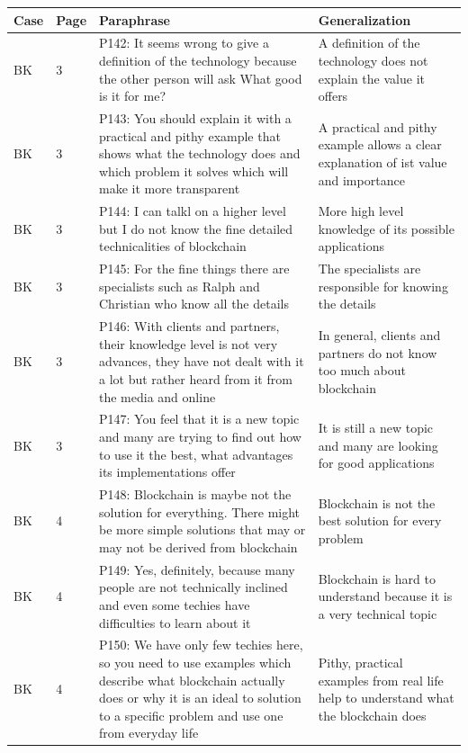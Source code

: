 \begin{table}[H]
    \centering
    \begin{tabularx}{\textwidth}{ll|X|p{4.5cm}}
	Case & Page & Paraphrase & Generalization \\ \hline
	BK & 3 & P142: It seems wrong to give a definition of the technology because the other person will ask What good is it for me?  & A definition of the technology does not explain the value it offers \\  
	BK & 3 & P143: You should explain it with a practical and pithy example that shows what the technology does and which problem it solves which will make it more transparent & A practical and pithy example allows a clear explanation of ist value and importance \\  
	BK & 3 & P144: I can talkl on a higher level but I do not know the fine detailed technicalities of blockchain & More high level knowledge of its possible applications \\  
	BK & 3 & P145: For the fine things there are specialists such as Ralph and Christian who know all the details & The specialists are responsible for knowing the details \\  
	BK & 3 & P146: With clients and partners, their knowledge level is not very advances, they have not dealt with it a lot but rather heard from it from the media and online & In general, clients and partners do not know too much about blockchain \\  
	BK & 3 & P147: You feel that it is a new topic and many are trying to find out how to use it the best, what advantages its implementations offer & It is still a new topic and many are looking for good applications \\  
	BK & 4 & P148: Blockchain is maybe not the solution for everything. There might be more simple solutions that may or may not be derived from blockchain & Blockchain is not the best solution for every problem \\  
	BK & 4 & P149: Yes, definitely, because many people are not technically inclined and even some techies have difficulties to learn about it & Blockchain is hard to understand because it is a very technical topic \\  
	BK & 4 & P150: We have only few techies here, so you need to use examples which describe what blockchain actually does or why it is an ideal to solution to a specific problem and use one from everyday life & Pithy, practical examples from real life help to understand what the blockchain does \\  

\end{tabularx}
\end{table}
